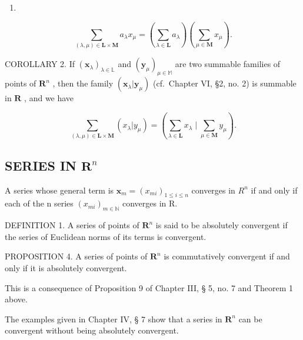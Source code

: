 \begin{enumerate}
\def\labelenumi{(\arabic{enumi})}
\setcounter{enumi}{3}
\tightlist
\item
\end{enumerate}

\[
\sum_ {(\lambda , \mu) \in \mathbf {L} \times \mathbf {M}} a _ {\lambda} x _ {\mu} = \left(\sum_ {\lambda \in \mathbf {L}} a _ {\lambda}\right) \left(\sum_ {\mu \in \mathbf {M}} x _ {\mu}\right).
\]

COROLLARY 2. If \((\pmb{x}_{\lambda})_{\lambda \in \mathbb{L}}\) and \((\pmb{y}_{\mu})_{\mu \in \mathbb{M}}\) are two summable families of points of \(\mathbf{R}^n\) , then the family \((\pmb{x}_{\lambda}|\pmb{y}_{\mu})\) (cf.~Chapter VI, §2, no. 2) is summable in \(\mathbf{R}\) , and we have

\[
\sum_ {(\lambda , \mu) \in \mathbf {L} \times \mathbf {M}} (x _ {\lambda} | y _ {\mu}) = \left(\sum_ {\lambda \in \mathbf {L}} x _ {\lambda} \mid \sum_ {\mu \in \mathbf {M}} y _ {\mu}\right).\tag{5}
\]

\subsection{\texorpdfstring{SERIES IN \(\mathbf{R}^n\)}{SERIES IN R TO THE N}}

A series whose general term is \(\boldsymbol{x}_{m} = (x_{mi})_{1 \leqslant i \leqslant n}\) converges in \(R^{n}\) if and only if each of the n series \((x_{mi})_{m \in \mathbb{N}}\) converges in R.

DEFINITION 1. A series of points of \(\mathbf{R}^n\) is said to be absolutely convergent if the series of Euclidean norms of its terms is convergent.

PROPOSITION 4. A series of points of \(\mathbf{R}^n\) is commutatively convergent if and only if it is absolutely convergent.

This is a consequence of Proposition 9 of Chapter III, § 5, no. 7 and Theorem 1 above.

The examples given in Chapter IV, § 7 show that a series in \(\mathbf{R}^n\) can be convergent without being absolutely convergent.
